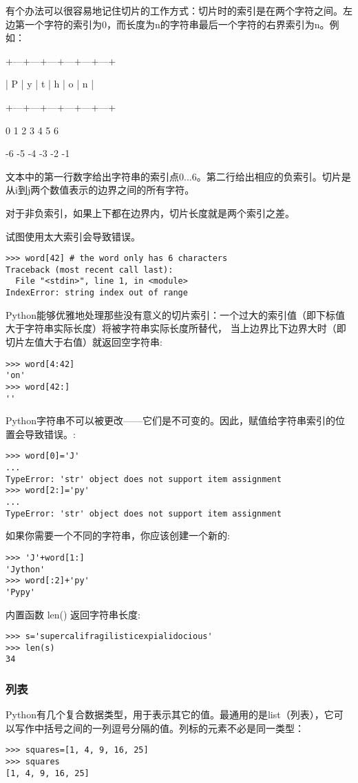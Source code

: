 \documentclass[UTF8]{ctexart}
\begin{document}
有个办法可以很容易地记住切片的工作方式：切片时的索引是在两个字符之间。左边第一个字符的索引为0，而长度为n的字符串最后一个字符的右界索引为n。例如：

+---+---+---+---+---+---+

| P | y | t | h | o | n |

+---+---+---+---+---+---+

0   1   2   3   4   5   6

-6  -5  -4  -3  -2  -1

文本中的第一行数字给出字符串的索引点0...6。第二行给出相应的负索引。切片是从i到j两个数值表示的边界之间的所有字符。

对于非负索引，如果上下都在边界内，切片长度就是两个索引之差。

试图使用太大索引会导致错误。
\begin{verbatim}
>>> word[42] # the word only has 6 characters
Traceback (most recent call last):
  File "<stdin>", line 1, in <module>
IndexError: string index out of range
\end{verbatim}

Python能够优雅地处理那些没有意义的切片索引：一个过大的索引值（即下标值大于字符串实际长度）将被字符串实际长度所替代，
当上边界比下边界大时（即切片左值大于右值）就返回空字符串:
\begin{verbatim}
>>> word[4:42]
'on'
>>> word[42:]
''
\end{verbatim}

Python字符串不可以被更改——它们是不可变的。因此，赋值给字符串索引的位置会导致错误。:
\begin{verbatim}
>>> word[0]='J'
...
TypeError: 'str' object does not support item assignment
>>> word[2:]='py'
...
TypeError: 'str' object does not support item assignment
\end{verbatim}

如果你需要一个不同的字符串，你应该创建一个新的:
\begin{verbatim}
>>> 'J'+word[1:]
'Jython'
>>> word[:2]+'py'
'Pypy'
\end{verbatim}

内置函数 len() 返回字符串长度:
\begin{verbatim}
>>> s='supercalifragilisticexpialidocious'
>>> len(s)
34
\end{verbatim}

\subsubsection{列表}
Python有几个复合数据类型，用于表示其它的值。最通用的是list（列表），它可以写作中括号之间的一列逗号分隔的值。列标的元素不必是同一类型：
\begin{verbatim}
>>> squares=[1, 4, 9, 16, 25]
>>> squares
[1, 4, 9, 16, 25]
\end{verbatim}
\end{document}
